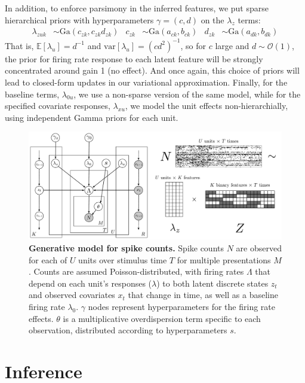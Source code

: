 \documentclass[10pt,letterpaper]{article}
\begin{document}
In addition, to enforce parsimony in the inferred features, we put sparse hierarchical priors with hyperparameters $\gamma = (c, d)$ on the $\lambda_z$ terms:
\begin{align}
    \label{hierarchy}
    \lambda_{zuk} &\sim \text{Ga}(c_{zk}, c_{zk} d_{zk}) & c_{zk} &\sim \text{Ga}(a_{ck}, b_{ck})
    & d_{zk} &\sim \text{Ga}(a_{dk}, b_{dk})
\end{align}
That is, $\mathbb{E}[\lambda_u] = d^{-1}$ and $\text{var}[\lambda_u] = (cd^2)^{-1}$, so for $c$ large and $d\sim \mathcal{O}(1)$, the prior for firing rate response to each latent feature will be strongly concentrated around gain 1 (no effect). And once again, this choice of priors will lead to closed-form updates in our variational approximation. Finally, for the baseline terms, $\lambda_{0u}$, we use a non-sparse version of the same model, while for the specified covariate responses, $\lambda_{xu}$, we model the unit effects non-hierarchially, using independent Gamma priors for each unit.

\begin{figure}[!h]
    \center
    \includegraphics[width=\linewidth]{figures/model}
	\caption{{\bf Generative model for spike counts.}
	Spike counts $N$ are observed for each of $U$ units over stimulus time $T$ for multiple presentations $M$. Counts are assumed Poisson-distributed, with firing rates $\Lambda$ that depend on each unit's responses ($\lambda$) to both latent discrete states $z_t$ and observed covariates $x_t$ that change in time, as well as a baseline firing rate $\lambda_0$. $\gamma$ nodes represent hyperparameters for the firing rate effects. $\theta$ is a multiplicative overdispersion term specific to each observation, distributed according to hyperparameters $s$.}
\label{fig1}
\end{figure}


\section*{Inference}
\end{document}
